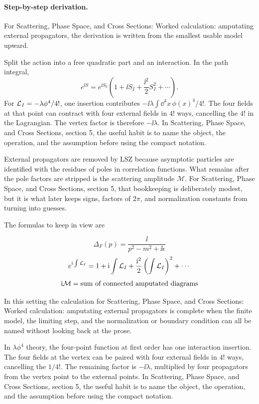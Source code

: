 \paragraph{Step-by-step derivation.}

For Scattering, Phase Space, and Cross Sections: Worked calculation: amputating external propagators, the derivation is written from the smallest usable model upward.

Split the action into a free quadratic part and an interaction.  In the path integral,
\[
  e^{\ii S}=e^{\ii S_0}\left(1+\ii S_I+\frac{\ii^2}{2}S_I^2+\cdots\right).
\]
For \(\mathcal L_I=-\lambda\phi^4/4!\), one insertion contributes \(-\ii\lambda\int\dd^4x\,\phi(x)^4/4!\).  The four fields at that point can contract with four external fields in \(4!\) ways, cancelling the \(4!\) in the Lagrangian.  The vertex factor is therefore \(-\ii\lambda\).  In Scattering, Phase Space, and Cross Sections, section 5, the useful habit is to name the object, the operation, and the assumption before using the compact notation.

External propagators are removed by LSZ because asymptotic particles are identified with the residues of poles in correlation functions.  What remains after the pole factors are stripped is the scattering amplitude \(\mathcal M\).  For Scattering, Phase Space, and Cross Sections, section 5, that bookkeeping is deliberately modest, but it is what later keeps signs, factors of \(2\pi\), and normalization constants from turning into guesses.

The formulas to keep in view are

\[
  \Delta_F(p)=\frac{\ii}{p^2-m^2+\ii\epsilon}
\]
\[
  e^{\mathrm i\int\mathcal L_I}=1+\mathrm i\int\mathcal L_I+\frac{\mathrm i^2}{2}\left(\int\mathcal L_I\right)^2+\cdots
\]
\[
  \mathrm i\mathcal M=\hbox{sum of connected amputated diagrams}
\]

In this setting the calculation for Scattering, Phase Space, and Cross Sections: Worked calculation: amputating external propagators is complete when the finite model, the limiting step, and the normalization or boundary condition can all be named without looking back at the prose.




\begin{example}
In \(\lambda\phi^4\) theory, the four-point function at first order has one interaction insertion.  The four fields at the vertex can be paired with four external fields in \(4!\) ways, cancelling the \(1/4!\).  The remaining factor is \(-\ii\lambda\), multiplied by four propagators from the vertex point to the external points.  In Scattering, Phase Space, and Cross Sections, section 5, the useful habit is to name the object, the operation, and the assumption before using the compact notation.
\end{example}



